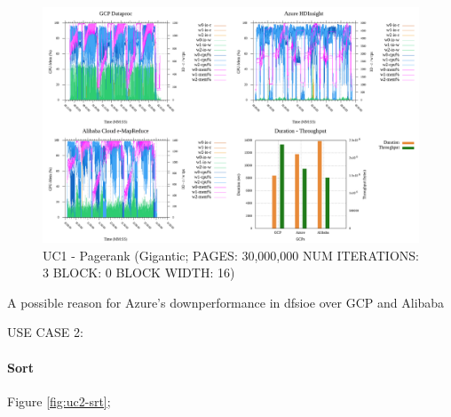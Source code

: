 \documentclass[review]{elsarticle}
\begin{document}
\begin{figure}[b]
	\includegraphics[width=\textwidth]{uc1-page-g-cmidt}
	\caption{UC1 - Pagerank (Gigantic; PAGES: 30,000,000 NUM ITERATIONS: 3 BLOCK: 0 BLOCK WIDTH: 16)}
	\label{fig:uc1-page-g-cmidt}
	\centering
\end{figure}

A possible reason for Azure's downperformance in dfsioe over GCP and Alibaba





USE CASE 2: 

\paragraph{Sort} Figure \ref{fig:uc2-srt}; 
\end{document}
